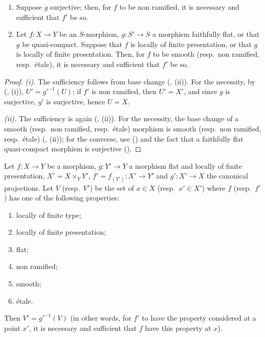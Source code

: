 \begin{corollary}[17.7.3]
\label{IV.17.7.3}
\begin{enumerate}[label=(\roman*)]
  \item Suppose $g$ surjective; then, for $f$ to be non ramified, it is necessary and sufficient that $f'$ be so.
  \item Let $f:X\to Y$ be an $S$-morphism, $g:S'\to S$ a morphism faithfully flat, or that $g$ be quasi-compact.
  Suppose that $f$ is locally of finite presentation, or that $g$ is locally of finite presentation.
  Then, for $f$ to be smooth (resp.\ non ramified, resp.\ \'etale), it is necessary and sufficient that $f'$ be so.
\end{enumerate}
\end{corollary}

\begin{proof}
\emph{(i).} The sufficiency follows from base change (, (ii)). For the necessity, by (, (i)), $U'=g'^{-1}(U)$; if $f'$ is non ramified, then $U'=X'$, and since $g$ is surjective, $g'$ is surjective, hence $U=X$.

\emph{(ii).} The sufficiency is again (, (ii)). For the necessity, the base change of a smooth (resp.\ non ramified, resp.\ \'etale) morphism is smooth (resp.\ non ramified, resp.\ \'etale) (, (ii)); for the converse, use () and the fact that a faithfully flat quasi-compact morphism is surjective ().
\end{proof}

\begin{proposition}[17.7.4]
\label{IV.17.7.4}
Let $f:X\to Y$ be a morphism, $g:Y'\to Y$ a morphism flat and locally of finite presentation, $X'=X\times_Y Y'$, $f'=f_{(Y')}:X'\to Y'$ and $g':X'\to X$ the canonical projections.
Let $V$ (resp.\ $V'$) be the set of $x\in X$ (resp.\ $x'\in X'$) where $f$ (resp.\ $f'$) has one of the following properties:
\begin{enumerate}[label=(\roman*)]
  \item locally of finite type;
  \item locally of finite presentation;
  \item flat;
  \item non ramified;
  \item smooth;
  \item \'etale.
\end{enumerate}
Then $V'=g'^{-1}(V)$ (in other words, for $f'$ to have the property considered at a point $x'$, it is necessary and sufficient that $f$ have this property at $x$).
\end{proposition}

